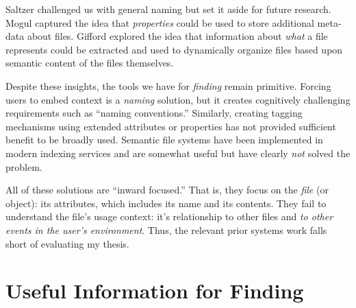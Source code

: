 Saltzer challenged us with general naming but set it aside for future research.
Mogul captured the idea that \emph{properties} could be used to store additional
meta-data about files.  Gifford explored the idea that information about \emph{what} a
file represents could be extracted and used to dynamically organize files based
upon semantic content of the files themselves.

Despite these insights, the tools we have for \emph{finding} remain
primitive. Forcing users to embed context is a \emph{naming} solution, but it
creates cognitively challenging requirements such as ``naming conventions.''
Similarly, creating tagging mechanisms using extended attributes or properties
has not provided sufficient benefit to be broadly used.  Semantic file systems
have been implemented in modern indexing services and are somewhat useful but
have clearly \emph{not} solved the problem.

All of these solutions are ``inward focused.'' That is, they focus on the
\emph{file} (or object): its attributes, which includes its name and its
contents. They fail to understand the file's usage context: it's relationship to
other files and \emph{to other events in the user's environment}. Thus, the
relevant prior systems work falls short of evaluating my thesis.

\section{Useful Information for Finding}
\label{ch:background:sec:useful-information-for-finding}

